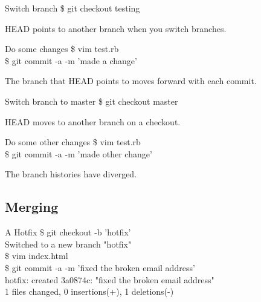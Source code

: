 \documentclass{beamer}
\begin{document}
\begin{frame}{Switch branch}
  \$ git checkout testing
\end{frame}

\begin{frame}{HEAD points to another branch when you switch branches.}
    \centering
    \hfill\vfill
\end{frame}

\begin{frame}{Do some changes}
  \$ vim test.rb\\
  \$ git commit -a -m 'made a change'
\end{frame}

\begin{frame}{The branch that HEAD points to moves forward with each commit.}
    \centering
    \hfill\vfill
\end{frame}

\begin{frame}{Switch branch to master}
  \$ git checkout master
\end{frame}

\begin{frame}{HEAD moves to another branch on a checkout.}
    \centering
    \hfill\vfill
\end{frame}

\begin{frame}{Do some other changes}
  \$ vim test.rb\\
  \$ git commit -a -m 'made other change'
\end{frame}

\begin{frame}{The branch histories have diverged.}
    \centering
    \hfill\vfill
\end{frame}

\subsection{Merging}

\begin{frame}{A Hotfix}
  \$ git checkout -b 'hotfix'\\
  Switched to a new branch "hotfix"\\
  \$ vim index.html\\
  \$ git commit -a -m 'fixed the broken email address'\\
  hotfix: created 3a0874c: "fixed the broken email address"\\
   1 files changed, 0 insertions(+), 1 deletions(-)
\end{frame}
\end{document}

